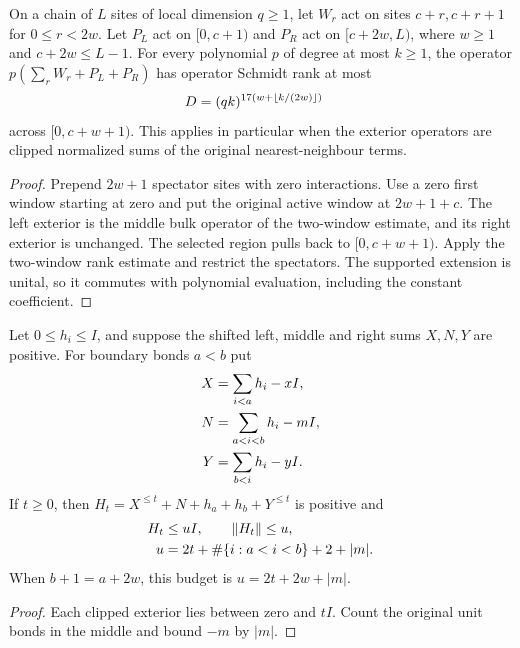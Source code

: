\begin{lemma}
    \label{lem:aklv_single_window_polynomial_rank}
    \leanok
    On a chain of $L$ sites of local dimension $q\ge1$, let $W_r$ act on sites
    $c+r,c+r+1$ for $0\le r<2w$. Let $P_L$ act on $[0,c+1)$
    and $P_R$ act on $[c+2w,L)$, where $w\ge1$ and
    $c+2w\le L-1$. For every polynomial $p$ of degree at most $k\ge1$,
    the operator $p(\sum_rW_r+P_L+P_R)$ has operator Schmidt rank at most
    \begin{align}
        D & =(qk)^{17(w+\lfloor k/(2w)\rfloor)}\notag
    \end{align}
    across $[0,c+w+1)$.
    This applies in particular when the exterior operators are clipped
    normalized sums of the original nearest-neighbour terms.
\end{lemma}
\begin{proof}\leanok
    Prepend $2w+1$ spectator sites with zero interactions.
    Use a zero first window starting at zero and put the original active
    window at $2w+1+c$. The left exterior is the middle bulk operator of
    the two-window estimate, and its right exterior is unchanged.
    The selected region pulls back to $[0,c+w+1)$.
    Apply the two-window rank estimate and restrict the spectators.
    The supported extension is unital, so it commutes with polynomial
    evaluation, including the constant coefficient.
\end{proof}

\begin{lemma}
    \label{lem:aklv_clipped_chain_norm}
    \leanok
    Let $0\le h_i\le I$, and suppose the shifted left, middle and
    right sums $X,N,Y$ are positive. For boundary bonds $a<b$ put
    \begin{align}
        X & =\sum_{i<a}h_i-xI,\notag   \\
        N & =\sum_{a<i<b}h_i-mI,\notag \\
        Y & =\sum_{b<i}h_i-yI.\notag
    \end{align}
    If $t\ge0$, then
    $H_t=X^{\le t}+N+h_a+h_b+Y^{\le t}$ is positive and
    \begin{align}
        H_t & \le uI,\qquad \|H_t\|\le u,\notag \\
        u   & =2t+\#\{i:a<i<b\}+2+|m|.\notag
    \end{align}
    When $b+1=a+2w$, this budget is $u=2t+2w+|m|$.
\end{lemma}
\begin{proof}\leanok
    Each clipped exterior lies between zero and $tI$.
    Count the original unit bonds in the middle and bound $-m$ by $|m|$.
\end{proof}

